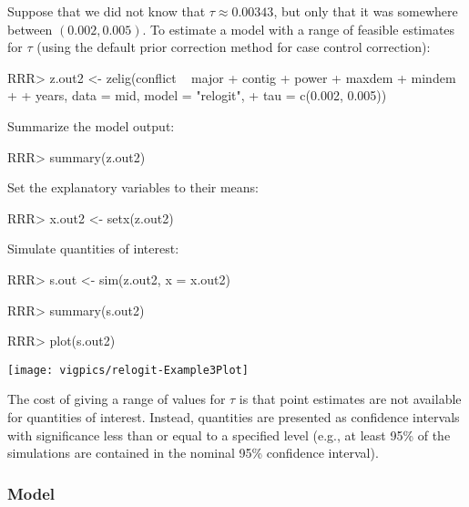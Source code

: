 Suppose that we did not know that $\tau \approx 0.00343$, but only
that it was somewhere between $(0.002, 0.005)$.  To estimate a model
with a range of feasible estimates for $\tau$ (using the default prior
correction method for case control correction):
\begin{Schunk}
\begin{Sinput}
RRR>  z.out2 <- zelig(conflict ~ major + contig + power + maxdem + mindem 
+                   + years, data = mid, model = "relogit", 
+                   tau = c(0.002, 0.005))
\end{Sinput}
\end{Schunk}
Summarize the model output:  
\begin{Schunk}
\begin{Sinput}
RRR>  summary(z.out2)
\end{Sinput}
\end{Schunk}
Set the explanatory variables to their means:  
\begin{Schunk}
\begin{Sinput}
RRR>  x.out2 <- setx(z.out2)
\end{Sinput}
\end{Schunk}
Simulate quantities of interest:
\begin{Schunk}
\begin{Sinput}
RRR>  s.out <- sim(z.out2, x = x.out2)
\end{Sinput}
\end{Schunk}
\begin{Schunk}
\begin{Sinput}
RRR> summary(s.out2)
\end{Sinput}
\end{Schunk}
\begin{center}
\begin{Schunk}
\begin{Sinput}
RRR>  plot(s.out2)
\end{Sinput}
\end{Schunk}
\texttt{[image: vigpics/relogit-Example3Plot]}
\end{center}
The cost of giving a range of values for $\tau$ is that point
estimates are not available for quantities of interest.  Instead,
quantities are presented as confidence intervals with significance
less than or equal to a specified level (e.g., at least 95\% of the
simulations are contained in the nominal 95\% confidence interval).  

\subsubsection{Model}

